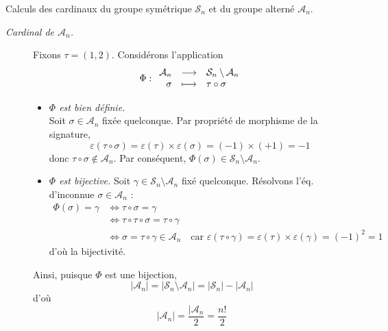 \documentclass{article}
\renewenvironment{question_kholle}[2][ ]
{
	\subsection{\texorpdfstring{#2}{}}
	\notblank{#1}
	{
		\noindent #1
		\bigbreak
	}
	{}
	\begin{proof}
}
{
	\end{proof}
}
\begin{document}
\begin{question_kholle}{Calculs des cardinaux du groupe symétrique $\mathcal{S}_{n}$ et du groupe alterné $\mathcal{A}_{n}$.}
\begin{description}
		\item [\textit{Cardinal de $\mathcal{A}_{n}$.}] Fixons $\tau=(1,2)$. Considérons l’application
		      \[
			      \Phi:\begin{array}{rcl} \mathcal{A}_{n} & \longrightarrow & \mathcal{S}_{n}\setminus \mathcal{A}_{n} \\ \sigma & \longmapsto & \tau\circ \sigma \end{array}
		      \]
		      \begin{itemize}
			      \item \textit{$\Phi$ est bien définie.}\\
			            Soit $\sigma\in \mathcal{A}_{n}$ fixée quelconque. Par propriété de morphisme de la signature,
			            \[
				            \varepsilon(\tau\circ \sigma) = \varepsilon(\tau)\times \varepsilon(\sigma) = (-1)\times (+1)= -1
			            \]
			            donc $\tau\circ \sigma\notin \mathcal{A}_{n}$. Par conséquent, $\Phi(\sigma)\in \mathcal{S}_{n}\setminus \mathcal{A}_{n}$.
			      \item \textit{$\Phi$ est bijective.} Soit $\gamma\in \mathcal{S}_{n}\setminus \mathcal{A}_{n}$ fixé quelconque. Résolvons l’éq. d’inconnue $\sigma\in \mathcal{A}_{n}$ :
			            \begin{align*}
				            \Phi(\sigma)=\gamma & \iff  \tau\circ \sigma=\gamma                                                                                                                               \\
				                                & \iff \tau\circ \tau \circ \sigma = \tau\circ \gamma                                                                                                         \\
				                                & \iff  \sigma = \tau\circ \gamma \in\mathcal{A}_{n} \quad\text{car $\varepsilon(\tau\circ \gamma)=\varepsilon(\tau)\times \varepsilon(\gamma) = (-1)^{2}=1$}
			            \end{align*}
			            d’où la bijectivité.
		      \end{itemize}
		      Ainsi, puisque $\Phi$ est une bijection,
		      \[
			      |\mathcal{A}_{n}|=|\mathcal{S}_{n}\setminus \mathcal{A}_{n}| = |\mathcal{S}_{n}| - |\mathcal{A}_{n}|
		      \]
		      d’où
		      \[
			      |\mathcal{A}_{n}| = \frac{|\mathcal{A}_{n}}{2} = \frac{n!}{2}
		      \]

	\end{description}

\end{question_kholle}
\end{document}
